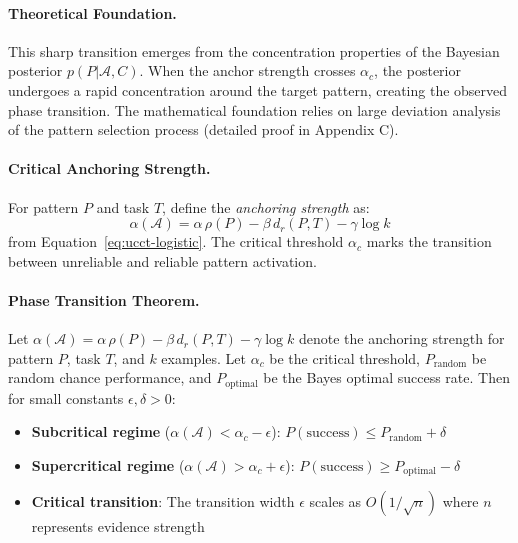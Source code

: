 \paragraph{Theoretical Foundation.}
This sharp transition emerges from the concentration properties of the Bayesian posterior $p(P|\mathcal{A},C)$. When the anchor strength crosses $\alpha_c$, the posterior undergoes a rapid concentration around the target pattern, creating the observed phase transition. The mathematical foundation relies on large deviation analysis of the pattern selection process (detailed proof in Appendix C).

\paragraph{Critical Anchoring Strength.}
For pattern $P$ and task $T$, define the \emph{anchoring strength} as:
\begin{equation}
\alpha(\mathcal{A}) = \alpha\,\rho(P) - \beta\,d_r(P,T) - \gamma\log k
\end{equation}
from Equation~\eqref{eq:ucct-logistic}. The critical threshold $\alpha_c$ marks the transition between unreliable and reliable pattern activation.

\paragraph{Phase Transition Theorem.}
\begin{theorem}
Let $\alpha(\mathcal{A}) = \alpha\,\rho(P) - \beta\,d_r(P,T) - \gamma\log k$ denote the anchoring strength for pattern $P$, task $T$, and $k$ examples. Let $\alpha_c$ be the critical threshold, $P_{\text{random}}$ be random chance performance, and $P_{\text{optimal}}$ be the Bayes optimal success rate. Then for small constants $\epsilon, \delta > 0$:

\begin{itemize}[leftmargin=2em,itemsep=1pt]
\item \textbf{Subcritical regime} ($\alpha(\mathcal{A}) < \alpha_c - \epsilon$): $P(\text{success}) \leq P_{\text{random}} + \delta$
\item \textbf{Supercritical regime} ($\alpha(\mathcal{A}) > \alpha_c + \epsilon$): $P(\text{success}) \geq P_{\text{optimal}} - \delta$  
\item \textbf{Critical transition}: The transition width $\epsilon$ scales as $O(1/\sqrt{n})$ where $n$ represents evidence strength
\end{itemize}
\end{theorem}


